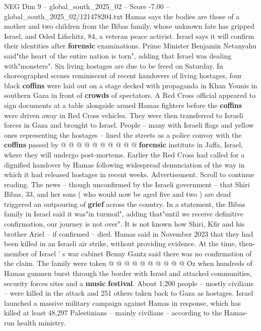 \begin{textsample}{NEG Dim 9 – global\_south\_2025\_02 – Score -7.00 – global\_south\_2025\_02/121478204.txt}  \label{ex:f9_neg_189}
Hamas says the bodies are those of a mother and two children from the Bibas family, whose unknown fate has gripped Israel, and Oded Lifschitz, 84, a veteran peace activist.
Israel says it will confirm their identities after \textbf{forensic} examinations.
Prime Minister Benjamin Netanyahu said"the heart of the entire nation is torn", adding that Israel was dealing with"monsters".
Six living hostages are due to be freed on Saturday.
In choreographed scenes reminiscent of recent handovers of living hostages, four black \textbf{coffins} were laid out on a stage decked with propaganda in Khan Younis in southern Gaza in front of \textbf{crowds} of spectators.
A Red Cross official appeared to sign documents at a table alongside armed Hamas fighters before the \textbf{coffins} were driven away in Red Cross vehicles.
They were then transferred to Israeli forces in Gaza and brought to Israel.
People -- many with Israeli flags and yellow ones representing the hostages -- lined the streets as a police convoy with the \textbf{coffins} passed by @ @ @ @ @ @ @ @ @ @ \textbf{forensic} institute in Jaffa, Israel, where they will undergo post-mortems.
Earlier the Red Cross had called for a dignified handover by Hamas following widespread denunciation of the way in which it had released hostages in recent weeks.
Advertisement.
Scroll to continue reading.
The news -- though unconfirmed by the Israeli government -- that Shiri Bibas, 33, and her sons ( who would now be aged five and two ) are dead triggered an outpouring of \textbf{grief} across the country.
In a statement, the Bibas family in Israel said it was"in turmoil", adding that"until we receive definitive confirmation, our journey is not over".
It is not known how Shiri, Kfir and his brother Ariel -- if confirmed -- died.
Hamas said in November 2023 that they had been killed in an Israeli air strike, without providing evidence.
At the time, then-member of Israel ' s war cabinet Benny Gantz said there was no confirmation of the claim.
The family were taken @ @ @ @ @ @ @ @ @ @ Oz when hundreds of Hamas gunmen burst through the border with Israel and attacked communities, security forces sites and a \textbf{music} \textbf{festival}.
About 1,200 people -- mostly civilians -- were killed in the attack and 251 others taken back to Gaza as hostages.
Israel launched a massive military campaign against Hamas in response, which has killed at least 48,297 Palestinians -- mainly civilians -- according to the Hamas-run health ministry.

\end{textsample}
